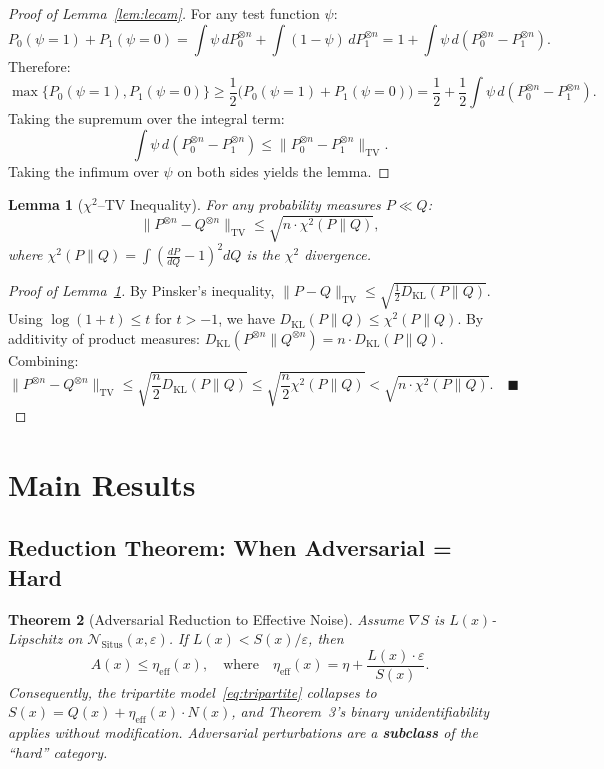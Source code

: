 \documentclass[12pt,a4paper]{article}
\newtheorem{theorem}{Theorem}[section]
\newtheorem{lemma}[theorem]{Lemma}
\newcommand{\cN}{\mathcal{N}}
\newcommand{\KL}{D_{\mathrm{KL}}}
\newcommand{\Situs}{\mathrm{Situs}}
\newcommand{\TV}{\mathrm{TV}}
\begin{document}
\begin{proof}[Proof of Lemma~\ref{lem:lecam}]
For any test function $\psi$:
\[
P_0(\psi=1) + P_1(\psi=0) = \int \psi \, dP_0^{\otimes n} + \int (1-\psi) \, dP_1^{\otimes n}
= 1 + \int \psi \, d(P_0^{\otimes n} - P_1^{\otimes n}).
\]
Therefore:
\[
\max\{P_0(\psi=1), P_1(\psi=0)\}
   \geq \frac12 \bigl( P_0(\psi=1) + P_1(\psi=0) \bigr)
   = \frac12 + \frac12 \int \psi \, d(P_0^{\otimes n} - P_1^{\otimes n}).
\]
Taking the supremum over the integral term:
\[
\int \psi \, d(P_0^{\otimes n} - P_1^{\otimes n}) \leq \|P_0^{\otimes n} - P_1^{\otimes n}\|_{\TV}.
\]
Taking the infimum over $\psi$ on both sides yields the lemma.
\end{proof}

\begin{lemma}[$\chi^2$--TV Inequality]
\label{lem:chi2-tv}
For any probability measures $P \ll Q$:
\[
\|P^{\otimes n} - Q^{\otimes n}\|_{\TV} \leq \sqrt{n \cdot \chi^2(P\|Q)},
\]
where $\chi^2(P\|Q) = \int (\frac{dP}{dQ} - 1)^2 dQ$ is the $\chi^2$ divergence.
\end{lemma}

\begin{proof}[Proof of Lemma~\ref{lem:chi2-tv}]
By Pinsker's inequality, $\|P-Q\|_{\TV} \leq \sqrt{\frac12 \KL(P\|Q)}$.
Using $\log(1+t) \leq t$ for $t>-1$, we have $\KL(P\|Q) \leq \chi^2(P\|Q)$.
By additivity of product measures: $\KL(P^{\otimes n}\|Q^{\otimes n}) = n \cdot \KL(P\|Q)$.
Combining:
\[
\|P^{\otimes n} - Q^{\otimes n}\|_{\TV}
   \leq \sqrt{\frac{n}{2} \KL(P\|Q)}
   \leq \sqrt{\frac{n}{2} \chi^2(P\|Q)}
   < \sqrt{n \cdot \chi^2(P\|Q)}.
\quad\blacksquare
\]
\end{proof}

\section{Main Results}

\subsection{Reduction Theorem: When Adversarial = Hard}

\begin{theorem}[Adversarial Reduction to Effective Noise]
\label{thm:reduction}
Assume $\nabla S$ is $L(x)$-Lipschitz on $\cN_{\Situs}(x, \varepsilon)$.
If $L(x) < S(x)/\varepsilon$, then
\begin{equation}\label{eq:reduction-bound}
    A(x) \leq \eta_{\mathrm{eff}}(x),
    \quad\text{where}\quad
    \eta_{\mathrm{eff}}(x) = \eta + \frac{L(x) \cdot \varepsilon}{S(x)}.
\end{equation}
Consequently, the tripartite model~\eqref{eq:tripartite} collapses to
$S(x) = Q(x) + \eta_{\mathrm{eff}}(x) \cdot N(x)$, and Theorem~3's binary
unidentifiability applies without modification.  Adversarial perturbations
are a \textbf{subclass} of the ``hard'' category.
\end{theorem}
\end{document}

